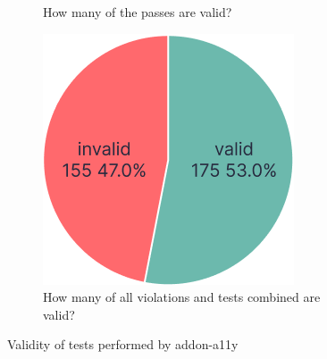 \documentclass{master_thesis}
\begin{document}
\begin{figure}[ht]
\begin{subfigure}{0.3\textwidth}
	\caption{How many of the passes are valid?}
	\label{fig:checks-validity-passed}
	\end{subfigure}
	\hspace{0.03\textwidth}
	\begin{subfigure}{0.3\textwidth}
	\includegraphics[width=\textwidth]{img/violations+passes.png}
	\caption{How many of all violations and tests combined are valid?}
	\label{fig:checks-validity-all}
	\end{subfigure}
\caption{Validity of tests performed by addon-a11y}
\label{fig:checks-validity}
\end{figure}
\end{document}
